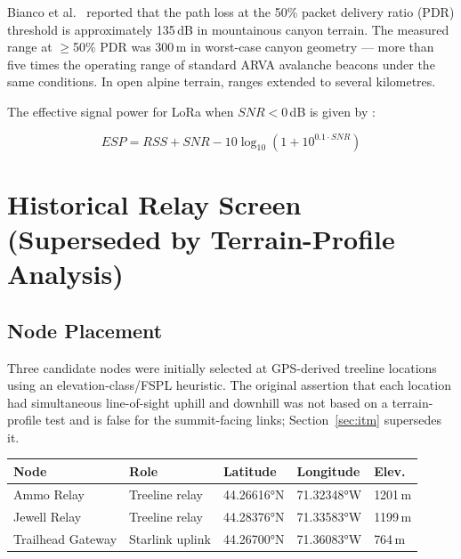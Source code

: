 \documentclass[11pt,letterpaper]{article}
\begin{document}
Bianco et al.\ \cite{bianco2021} reported that the path loss at the 50\% packet delivery
ratio (PDR) threshold is approximately 135\,dB in mountainous canyon terrain.
The measured range at $\geq$50\% PDR was 300\,m in worst-case canyon geometry --- more
than five times the operating range of standard ARVA avalanche beacons under the same
conditions. In open alpine terrain, ranges extended to several kilometres.

The effective signal power for LoRa when $SNR < 0$\,dB is given by \cite{review2024}:

\begin{equation}
  ESP = RSS + SNR - 10\log_{10}\!\left(1 + 10^{0.1 \cdot SNR}\right)
  \label{eq:esp}
\end{equation}

\section{Historical Relay Screen (Superseded by Terrain-Profile Analysis)}

\subsection{Node Placement}

Three candidate nodes were initially selected at GPS-derived treeline locations using an
elevation-class/FSPL heuristic. The original assertion that each location had simultaneous
line-of-sight uphill and downhill was not based on a terrain-profile test and is false for
the summit-facing links; Section~\ref{sec:itm} supersedes it.

\begin{center}
\begin{tabular}{@{}lllll@{}}
\toprule
\textbf{Node} & \textbf{Role} & \textbf{Latitude} & \textbf{Longitude} & \textbf{Elev.} \\
\midrule
\textcolor{relayorange}{Ammo Relay}    & Treeline relay    & 44.26616°N & 71.32348°W & 1201\,m \\
\textcolor{relayorange}{Jewell Relay}  & Treeline relay    & 44.28376°N & 71.33583°W & 1199\,m \\
\textcolor{gatewaypurple}{Trailhead Gateway} & Starlink uplink & 44.26700°N & 71.36083°W & 764\,m \\
\bottomrule
\end{tabular}
\end{center}
\end{document}

